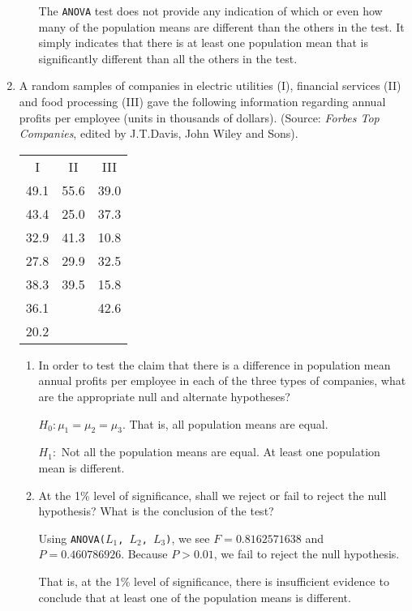 \documentclass{article}
\begin{document}
\begin{enumerate}
\begin{enumerate}
	{\answer The \texttt{ANOVA} test does not provide any indication of which or even how many of the population means are different than the others in the test.  It simply indicates that there is at least one population mean that is significantly different than all the others in the test.} 
	\end{enumerate}

\item A random samples of companies in electric utilities (I), financial services (II) and food processing (III) gave the following information regarding annual profits per employee (units in thousands of dollars). (Source: {\em Forbes Top Companies}, edited by J.T.Davis, John Wiley and Sons). 

\begin{center}
\begin{tabular} {ccc}
I & II & III \\
49.1 & 55.6 & 39.0 \\
43.4 & 25.0 & 37.3 \\
32.9 & 41.3 & 10.8 \\
27.8 & 29.9 & 32.5 \\
38.3 & 39.5 & 15.8 \\
36.1 & & 42.6 \\
20.2 & & \\
\end{tabular}
\end{center}

	\begin{enumerate}
	\item In order to test the claim that there is a difference in population mean annual profits per employee in each of the three types of companies, what are the appropriate null and alternate hypotheses? 
	
	{\answer $H_0: \mu_1 = \mu_2 = \mu_3$.  That is, all population means are equal. 
	
	$H_1:$ Not all the population means are equal.  At least one population mean is different. } 
	
	\item At the 1\% level of significance, shall we reject or fail to reject the null hypothesis? What is the conclusion of the test? 
	
	{\answer Using \texttt{ANOVA($L_1$, $L_2$, $L_3$)}, we see $F= 0.8162571638$ and $P=0.460786926$.  Because $P > 0.01$, we fail to reject the null hypothesis. 
	
	That is, at the 1\% level of significance, there is insufficient evidence to conclude that at least one of the population means is different.} 
	\end{enumerate}


\end{enumerate}
\end{document}
